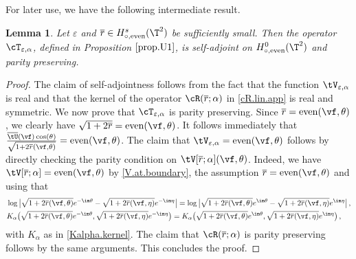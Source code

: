 \documentclass[a4paper,reqno,10pt]{article}
\newtheorem{lem}{Lemma}[section]
\begin{document}
\noindent
For later use, we have the following intermediate result.
\begin{lem}\label{sa.pp.T.eps}
Let $\varepsilon$ and $\overline{r}\in H^s_{\circ,\textnormal{even}}(\T^2)$ be sufficiently small. Then the operator $\cT_{\varepsilon,\alpha}$, defined in Proposition $\ref{prop.U1}$, is self-adjoint on $H^0_{\circ,\textnormal{even}}(\T^2)$ and parity preserving.  
\end{lem}
\begin{proof}
	The claim of self-adjointness follows from the fact that the function $\tV_{\varepsilon,\alpha}$ is real and that the kernel of the operator $\cR(\overline r;\alpha)$ in \eqref{cR.lin.app} is real and symmetric. 	
	We now prove that $\cT_{\varepsilon,\alpha}$ is parity preserving.
	Since $\overline r = {\rm even}(\vf,\theta)$, we clearly have $\sqrt{1+2\overline r} ={\rm even}(\vf,\theta)$. It follows immediately that $ \frac{\overline \tU(\vf) \cos(\theta)}{\sqrt{1+2\overline r(\vf,\theta)}}={\rm even}(\vf,\theta)$. The claim that $\tV_{\varepsilon,\alpha}={\rm even}(\vf,\theta)$ follows by directly checking the parity condition on $\tV[\overline r;\alpha](\vf,\theta)$. Indeed, we have $\tV[\overline r;\alpha]={\rm even}(\vf,\theta)$ by \eqref{V.at.boundary},  the assumption $\overline r = {\rm even}(\vf,\theta)$ and using that
	\begin{equation}
		\begin{aligned}
			&\log \big| \sqrt{1+2\overline r(\vf,\theta)}e^{-\im\theta} - \sqrt{1+2\overline r(\vf,\eta)}e^{-\im\eta} \big| = \log \big| \sqrt{1+2\overline r(\vf,\theta)}e^{\im\theta} - \sqrt{1+2\overline r(\vf,\eta)}e^{\im\eta} \big| \,, \\
			& K_{\alpha} \big( \sqrt{1+2\overline r(\vf,\theta)}e^{-\im\theta}, \sqrt{1+2\overline r(\vf,\eta)}e^{-\im\eta} \big) = K_{\alpha} \big( \sqrt{1+2\overline r(\vf,\theta)}e^{\im\theta}, \sqrt{1+2\overline r(\vf,\eta)}e^{\im\eta} \big) \,,
		\end{aligned}
	\end{equation}
	with $K_\alpha$ as in \eqref{Kalpha.kernel}. The claim that $\cR(\overline r;\alpha)$ is parity preserving follows by the same arguments. This concludes the proof.
\end{proof}
\end{document}
